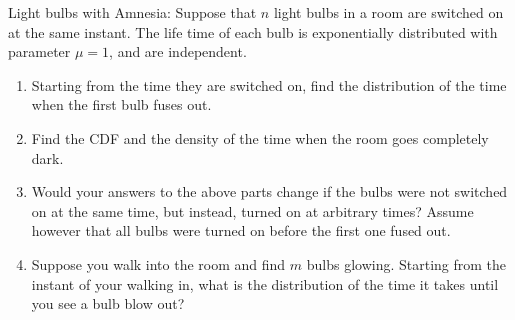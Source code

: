 \begin{exercise}
    Light bulbs with Amnesia: Suppose that \( n \) light bulbs in a room are switched on at the same instant. The life time of each bulb is exponentially distributed with parameter \( \mu = 1 \), and are independent.
    \begin{enumerate}[label=(\alph*)]
        \item Starting from the time they are switched on, find the distribution of the time when the first bulb fuses out.
        \item Find the CDF and the density of the time when the room goes completely dark.
        \item Would your answers to the above parts change if the bulbs were not switched on at the same time, but instead, turned on at arbitrary times? Assume however that all bulbs were turned on before the first one fused out.
        \item Suppose you walk into the room and find \( m \) bulbs glowing. Starting from the instant of your walking in, what is the distribution of the time it takes until you see a bulb blow out?
    \end{enumerate}
\end{exercise}

